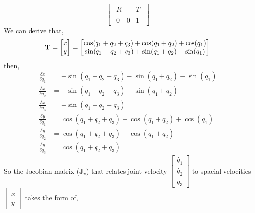 \begin{equation*}
    \begin{bmatrix}
        {\begin{array}{cc|c}R&&T\\&&\\\hline 0&0&1\end{array}}
    \end{bmatrix}
\end{equation*}
We can derive that,
\begin{equation*}
    \textbf{T} = \begin{bmatrix}
        x \\ y
    \end{bmatrix} = \begin{bmatrix}
        \cos(q_1 + q_2 + q_3) + \cos(q_1 + q_2) + \cos(q_1) \\
        \sin(q_1 + q_2 + q_3) + \sin(q_1 + q_2) + \sin(q_1)
    \end{bmatrix} \\
\end{equation*}
then,
\begin{equation*}
    \begin{split}
        \frac{\delta x}{\delta q_1} & = -\sin(q_1 + q_2 + q_3) - \sin(q_1 + q_2) - \sin(q_1) \\
        \frac{\delta x}{\delta q_2} & = -\sin(q_1 + q_2 + q_3) - \sin(q_1 + q_2)             \\
        \frac{\delta x}{\delta q_3} & = -\sin(q_1 + q_2 + q_3)                               \\
        \frac{\delta y}{\delta q_1} & =  \cos(q_1 + q_2 + q_3) + \cos(q_1 + q_2) + \cos(q_1) \\
        \frac{\delta y}{\delta q_2} & =  \cos(q_1 + q_2 + q_3) + \cos(q_1 + q_2)             \\
        \frac{\delta y}{\delta q_3} & = \cos(q_1 + q_2 + q_3)
    \end{split}
\end{equation*}
So the Jacobian matrix (\textbf{J$_v$}) that relates joint velocity $ \begin{bmatrix}
        \dot{q_1} \\ \dot{q_2} \\ \dot{q_3}
    \end{bmatrix} $ to spacial velocities $ \begin{bmatrix}
        \dot{x} \\ \dot{y}
    \end{bmatrix} $ takes the form of,
